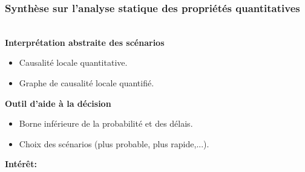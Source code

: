 \begin{frame}[c]
  \frametitle{Synthèse sur l'analyse statique des propriétés quantitatives}


{}\\
\medskip
\textbf{Interprétation abstraite des scénarios}
  \begin{itemize}
   \item Causalité locale quantitative.
   \item Graphe de causalité locale quantifié.
  \end{itemize}
\medskip
\textbf{Outil d'aide à la décision}
\begin{itemize}
 \item Borne inférieure de la probabilité et des délais.
 \item Choix des scénarios (plus probable, plus rapide,...).
\end{itemize}
\medskip
\textbf{Intérêt:}
\begin{center}

\end{center}



\end{frame}